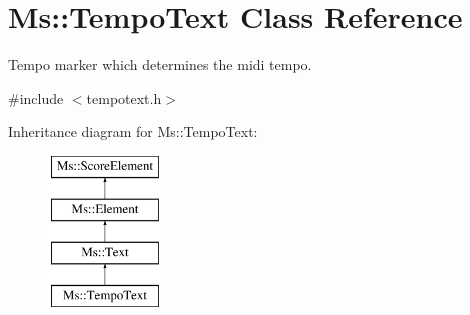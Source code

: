 \hypertarget{class_ms_1_1_tempo_text}{}\section{Ms\+:\+:Tempo\+Text Class Reference}
\label{class_ms_1_1_tempo_text}


Tempo marker which determines the midi tempo.  




{\ttfamily \#include $<$tempotext.\+h$>$}

Inheritance diagram for Ms\+:\+:Tempo\+Text\+:\begin{figure}[H]
\begin{center}
\leavevmode
\includegraphics[height=4.000000cm]{class_ms_1_1_tempo_text}
\end{center}
\end{figure}
